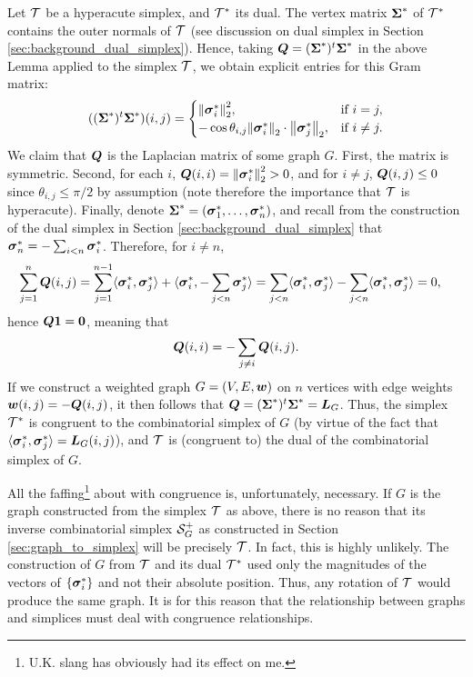 Let $\mathcal{T}$ be a hyperacute simplex, and $\mathcal{T}^*$ its dual. The vertex matrix $\boldsymbol{\Sigma}^*$ of $\mathcal{T}^*$ contains the outer normals of $\mathcal{T}$ (see discussion on dual simplex in Section \ref{sec:background_dual_simplex}). Hence, taking $\vb*{Q}=(\boldsymbol{\Sigma}^*)^t \boldsymbol{\Sigma}^*$ in the above Lemma applied to the simplex $\mathcal{T}$, we obtain explicit entries for this Gram matrix:  
\begin{equation*}
    ((\boldsymbol{\Sigma}^*)^t \boldsymbol{\Sigma}^*)(i,j) = \begin{cases}
    \norm{\vb*{\sigma}_i^*}_2^{2},& \text{if }i=j,\\
-\cos\theta_{i,j} \norm{\vb*{\sigma}_i^*}_2\cdot \norm{\vb*{\sigma}_j^*}_2,& \text{if }i\neq j.
    \end{cases}
\end{equation*}
We claim that $\vb*{Q}$ is the Laplacian matrix of some graph $G$. First, the matrix is symmetric. Second,
for each $i$, $\vb*{Q}(i,i)=\norm{\vb*{\sigma}_i^*}_2^{2}>0$, and for $i\neq j$, $\vb*{Q}(i,j) \leq 0$ since $\theta_{i,j}\leq \pi/2$ by assumption (note therefore the importance that $\mathcal{T}$ is hyperacute). Finally, denote $\boldsymbol{\Sigma}^*=(\vb*{\sigma}_1^*,\dots,\vb*{\sigma}^*_n)$, and recall from the construction of the dual simplex in Section \ref{sec:background_dual_simplex} that $\vb*{\sigma}_n^*=-\sum_{i<n}\vb*{\sigma}^*_i$. Therefore, for $i\neq n$, 
\begin{align*}
    \sum_{j=1}^n \vb*{Q}(i,j) &= \sum_{j=1}^{n-1} \langle \vb*{\sigma}^*_i,\vb*{\sigma}^*_j\rangle + \langle \vb*{\sigma}^*_i,-\sum_{j<n}\vb*{\sigma}_j^*\rangle = \sum_{j<n}\langle \vb*{\sigma}^*_i,\vb*{\sigma}^*_j\rangle - \sum_{j<n}\langle \vb*{\sigma}^*_i,\vb*{\sigma}^*_j\rangle  = 0,
\end{align*}
hence $\vb*{Q}\vb{1}=\vb{0}$, meaning that 
\[\vb*{Q}(i,i) = -\sum_{j\neq i}\vb*{Q}(i,j).\]
If we construct a weighted graph $G=(V,E,\vb*{w})$ on $n$ vertices with edge weights $\vb*{w}(i,j) = -\vb*{Q}(i,j)$, it then follows that $\vb*{Q}=(\boldsymbol{\Sigma}^*)^t\boldsymbol{\Sigma}^*=\vb*{L}_G$. Thus, the simplex $\mathcal{T}^*$ is congruent to the combinatorial simplex of $G$ (by virtue of the fact  that $\langle \vb*{\sigma}_i^*,\vb*{\sigma}_j^*\rangle = \vb*{L}_G(i,j)$), and $\mathcal{T}$ is (congruent to) the dual of the combinatorial simplex of $G$. 

\begin{remark}
	All the faffing\footnote{U.K. slang has obviously had its effect on me.} about with congruence is, unfortunately, necessary. If $G$ is the graph constructed from the simplex $\mathcal{T}$ as above, there is no reason that its inverse combinatorial simplex $\mathcal{S}^+_G$ as constructed in Section \ref{sec:graph_to_simplex} will be precisely $\mathcal{T}$. In fact, this is highly unlikely. The construction of $G$ from $\mathcal{T}$ and its dual $\mathcal{T}^*$ used only the magnitudes of the vectors of $\{\vb*{\sigma}_i^*\}$ and not their absolute position. Thus, any rotation of $\mathcal{T}$ would produce the same graph. It is for this reason that the relationship between graphs and simplices must deal with congruence  relationships. 
\end{remark}


